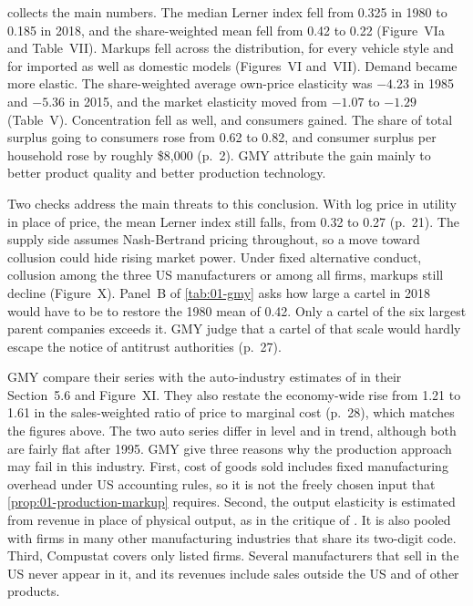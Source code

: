  collects the main numbers. The median Lerner index fell from 0.325 in 1980 to
0.185 in 2018, and the share-weighted mean fell from 0.42 to 0.22 (Figure~VIa and Table~VII). Markups fell across
the distribution, for every vehicle style and for imported as well as domestic models (Figures~VI and~VII). Demand
became more elastic. The share-weighted average own-price elasticity was $-4.23$ in 1985 and $-5.36$ in 2015, and
the market elasticity moved from $-1.07$ to $-1.29$ (Table~V). Concentration fell as well, and consumers gained.
The share of total surplus going to consumers rose from 0.62 to 0.82, and consumer surplus per household rose by
roughly \$8,000 (p.~2). GMY attribute the gain mainly to better product quality and better production technology.

Two checks address the main threats to this conclusion. With log price in utility in place of price, the mean
Lerner index still falls, from 0.32 to 0.27 (p.~21). The supply side assumes Nash-Bertrand pricing throughout, so
a move toward collusion could hide rising market power. Under fixed alternative conduct, collusion among the three
US manufacturers or among all firms, markups still decline (Figure~X). Panel~B of \cref{tab:01-gmy} asks how large
a cartel in 2018 would have to be to restore the 1980 mean of 0.42. Only a cartel of the six largest parent
companies exceeds it. GMY judge that a cartel of that scale would hardly escape the notice of antitrust
authorities (p.~27).

GMY compare their series with the auto-industry estimates
of \citet{DeLoeckerEeckhoutUnger2020} in their Section~5.6 and Figure~XI. They also restate the
economy-wide rise from 1.21 to 1.61 in the sales-weighted ratio of price to marginal cost (p.~28), which matches
the figures above. The two auto series differ in level and in trend, although both are fairly flat after 1995. GMY
give three reasons why the production approach may fail in this industry. First, cost of goods sold includes fixed
manufacturing overhead under US accounting rules, so it is not the freely chosen input that
\cref{prop:01-production-markup} requires. Second, the output elasticity is estimated from revenue in place of
physical output, as in the critique of \citet{BondEtAl2021}. It is also pooled with firms in many other
manufacturing industries that share its two-digit code. Third, Compustat covers only listed firms. Several
manufacturers that sell in the US never appear in it, and its revenues include sales outside the US and of other
products.

